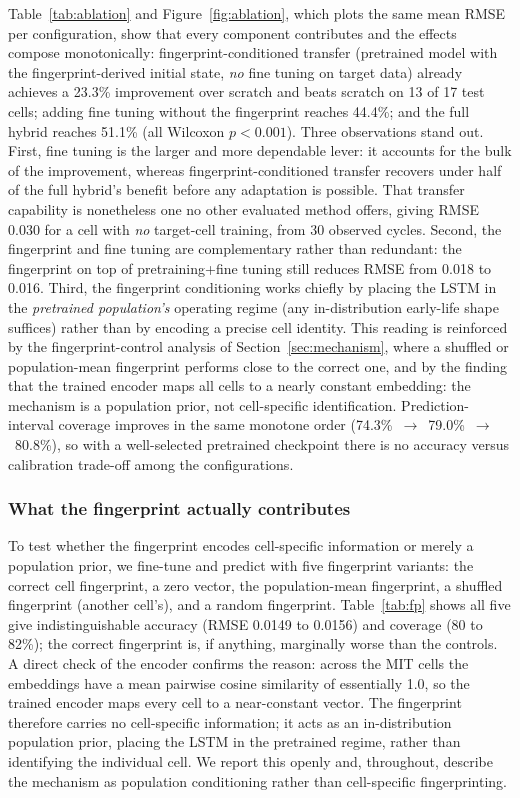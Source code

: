 Table~\ref{tab:ablation} and Figure~\ref{fig:ablation}, which plots the same
mean RMSE per configuration, show that every component contributes and the
effects compose monotonically: fingerprint-conditioned transfer (pretrained
model with the fingerprint-derived initial state, \emph{no} fine tuning on
target data) already achieves a 23.3\% improvement over scratch and beats
scratch on 13 of 17 test cells; adding fine tuning without the fingerprint
reaches 44.4\%; and the full hybrid reaches 51.1\% (all Wilcoxon $p<0.001$).
Three observations stand out.
First, fine tuning is the larger and more dependable lever: it accounts for the
bulk of the improvement, whereas fingerprint-conditioned transfer recovers
under half of the full hybrid's benefit before any adaptation is possible. That
transfer capability is nonetheless one no other evaluated method offers, giving
RMSE 0.030 for a cell with \emph{no} target-cell training, from 30 observed
cycles.
Second, the fingerprint and fine tuning are complementary rather than
redundant: the fingerprint on top of pretraining+fine tuning still reduces
RMSE from 0.018 to 0.016.
Third, the fingerprint conditioning works chiefly by placing the LSTM in the
\emph{pretrained population's} operating regime (any in-distribution early-life
shape suffices) rather than by encoding a precise cell identity. This reading is
reinforced by the fingerprint-control analysis of Section~\ref{sec:mechanism},
where a shuffled or population-mean fingerprint performs close to the correct
one, and by the finding that the trained encoder maps all cells to a nearly
constant embedding: the mechanism is a population prior, not cell-specific
identification.
Prediction-interval coverage improves in the same monotone order
(74.3\%~$\rightarrow$~79.0\%~$\rightarrow$~80.8\%), so with a
well-selected pretrained checkpoint there is no accuracy versus calibration
trade-off among the configurations.

\subsubsection{What the fingerprint actually contributes}\label{sec:fp_control}
To test whether the fingerprint encodes cell-specific information or merely a
population prior, we fine-tune and predict with five fingerprint variants: the
correct cell fingerprint, a zero vector, the population-mean fingerprint, a
shuffled fingerprint (another cell's), and a random fingerprint. Table~\ref{tab:fp}
shows all five give indistinguishable accuracy (RMSE 0.0149 to 0.0156) and coverage
(80 to 82\%); the correct fingerprint is, if anything, marginally worse than the
controls. A direct check of the encoder confirms the reason: across the MIT cells the
embeddings have a mean pairwise cosine similarity of essentially 1.0, so the trained
encoder maps every cell to a near-constant vector. The fingerprint therefore carries
no cell-specific information; it acts as an in-distribution population prior, placing
the LSTM in the pretrained regime, rather than identifying the individual cell. We
report this openly and, throughout, describe the mechanism as population conditioning
rather than cell-specific fingerprinting.

